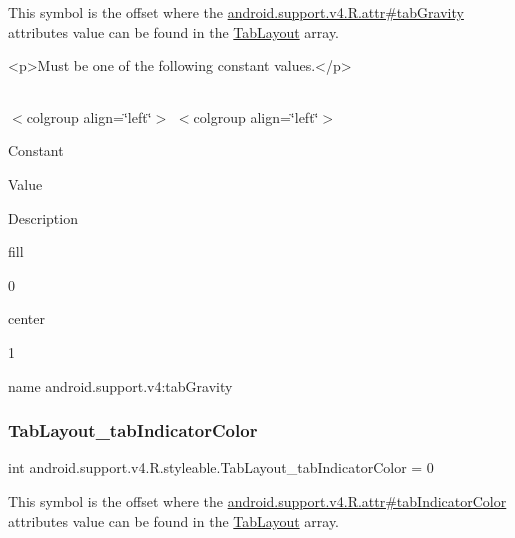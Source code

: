 This symbol is the offset where the \hyperlink{classandroid_1_1support_1_1v4_1_1R_1_1attr_a97c428cfd4a88c1bf6fe855469390abe}{android.\+support.\+v4.\+R.\+attr\#tab\+Gravity} attribute\textquotesingle{}s value can be found in the \hyperlink{classandroid_1_1support_1_1v4_1_1R_1_1styleable_a48e866d7121b40ef0bb3d467759606a9}{Tab\+Layout} array.

\begin{DoxyVerb}      <p>Must be one of the following constant values.</p>
\end{DoxyVerb}
 \tabulinesep=1mm
\begin{longtabu} spread 0pt [c]{*{0}{|X[-1]}|}
\hline
\end{longtabu}
$<$colgroup align=\char`\"{}left\char`\"{}$>$ $<$colgroup align=\char`\"{}left\char`\"{}$>$ 

Constant

Value

Description 

{\ttfamily fill}

0

{\ttfamily center}

1

name android.\+support.\+v4\+:tab\+Gravity \mbox{\label{classandroid_1_1support_1_1v4_1_1R_1_1styleable_ad73a1a29a20855a3bcc60d9bb7acd7b6}} 
\subsubsection{\texorpdfstring{Tab\+Layout\+\_\+tab\+Indicator\+Color}{TabLayout\_tabIndicatorColor}}
{\footnotesize\ttfamily int android.\+support.\+v4.\+R.\+styleable.\+Tab\+Layout\+\_\+tab\+Indicator\+Color = 0\hspace{0.3cm}{\ttfamily [static]}}

This symbol is the offset where the \hyperlink{classandroid_1_1support_1_1v4_1_1R_1_1attr_a75cc391c8e9b6a17ccd48f0d7c092d01}{android.\+support.\+v4.\+R.\+attr\#tab\+Indicator\+Color} attribute\textquotesingle{}s value can be found in the \hyperlink{classandroid_1_1support_1_1v4_1_1R_1_1styleable_a48e866d7121b40ef0bb3d467759606a9}{Tab\+Layout} array.

